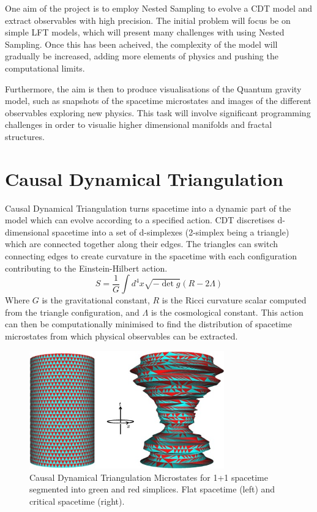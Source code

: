 \documentclass[a4paper]{article}
\begin{document}
    One aim of the project is to employ Nested Sampling to evolve a
    CDT model and extract observables with high precision. The initial
    problem will focus be on simple LFT models, which will present
    many challenges with using Nested Sampling. Once this has been
    acheived, the complexity of the model will gradually be increased,
    adding more elements of physics and pushing the computational
    limits. 

    Furthermore, the aim is then to produce visualisations of the Quantum
    gravity model, such as snapshots of the spacetime microstates and
    images of the different observables exploring new physics. This
    task will involve significant programming challenges in order to
    visualie higher dimensional manifolds and fractal structures.

    \section{Causal Dynamical Triangulation}
    Causal Dynamical Triangulation turns spacetime into a dynamic part of the model which can evolve according to a specified action. CDT discretises d-dimensional spacetime into a set of d-simplexes (2-simplex being a triangle) which are connected together along their edges. The triangles can switch connecting edges to create curvature in the spacetime with each configuration contributing to the Einstein-Hilbert action. 
    $$S = \frac{1}{G} \int{d^4x \sqrt{ - \det g} ( R - 2\Lambda ) } $$
    Where $G$ is the gravitational constant, $R$ is the Ricci curvature scalar computed from the triangle configuration, and $\Lambda$ is the cosmological constant. This action can then be computationally minimised to find the distribution of spacetime microstates from which physical observables can be extracted.

\begin{figure}[H]
\centering
\includegraphics[width=0.75\textwidth]{cdt}
\caption{Causal Dynamical Triangulation Microstates for 1+1 spacetime
  segmented into green and red simplices. Flat
  spacetime (left) and critical spacetime (right).\cite{3}}
\end{figure}
\end{document}
